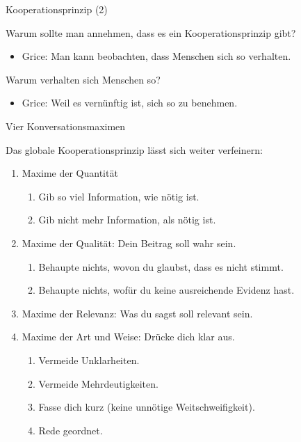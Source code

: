 \begin{frame}{Kooperationsprinzip (2)}

Warum sollte man annehmen, dass es ein Kooperationsprinzip gibt?
 \begin{itemize}
     \item Grice: Man kann beobachten, dass Menschen sich so verhalten.
  \end{itemize}
\pause

Warum verhalten sich Menschen so?
  \begin{itemize}
    \item Grice: Weil es vernünftig ist, sich so zu benehmen.
\end{itemize}
\end{frame}



\begin{frame}{Vier Konversationsmaximen}

Das globale Kooperationsprinzip lässt sich weiter verfeinern:

\begin{enumerate}
\item Maxime der \alert{Quantität}
    \begin{enumerate}
      \item Gib so viel Information, wie nötig ist.
      \item Gib nicht mehr Information, als nötig ist.
     \end{enumerate}\pause

\pause
\item Maxime der \alert{Qualität}: Dein Beitrag soll wahr sein.
  \begin{enumerate}
  \item Behaupte nichts, wovon du glaubst, dass es nicht stimmt.
  \item Behaupte nichts, wofür du keine ausreichende Evidenz hast.
  \end{enumerate}\pause

\pause
\item Maxime der \alert{Relevanz}: Was du sagst soll relevant sein.\pause

\pause
\item Maxime der \alert{Art und Weise}: Drücke dich klar aus.
  \begin{enumerate}
  \item Vermeide Unklarheiten.
  \item Vermeide Mehrdeutigkeiten.
  \item Fasse dich kurz (keine unnötige Weitschweifigkeit).
  \item Rede geordnet.
  \end{enumerate}
\end{enumerate}
\end{frame}


